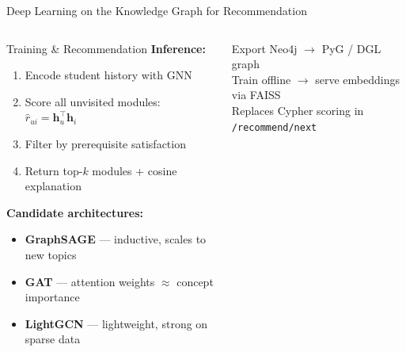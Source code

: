 \documentclass[aspectratio=169,9pt]{beamer}
\begin{document}
\begin{frame}{Deep Learning on the Knowledge Graph for Recommendation}
\begin{columns}[T]
\begin{block}{Training \& Recommendation}
    \medskip
    \textbf{Inference:}
    \begin{enumerate}
      \item Encode student history with GNN
      \item Score all unvisited modules:
        $\hat{r}_{ui} = \mathbf{h}_u^\top \mathbf{h}_i$
      \item Filter by prerequisite satisfaction
      \item Return top-$k$ modules + cosine explanation
    \end{enumerate}

    \medskip
    \textbf{Candidate architectures:}
    \begin{itemize}
      \item \textbf{GraphSAGE} — inductive, scales to new topics
      \item \textbf{GAT} — attention weights $\approx$ concept importance
      \item \textbf{LightGCN} — lightweight, strong on sparse data
    \end{itemize}
  \end{block}

  \begin{keybox}[title={Integration Plan}]
    \small
    Export Neo4j $\to$ PyG / DGL graph\\
    Train offline $\to$ serve embeddings via FAISS\\
    Replaces Cypher scoring in \texttt{/recommend/next}
  \end{keybox}
\end{columns}
\end{frame}
\end{document}
